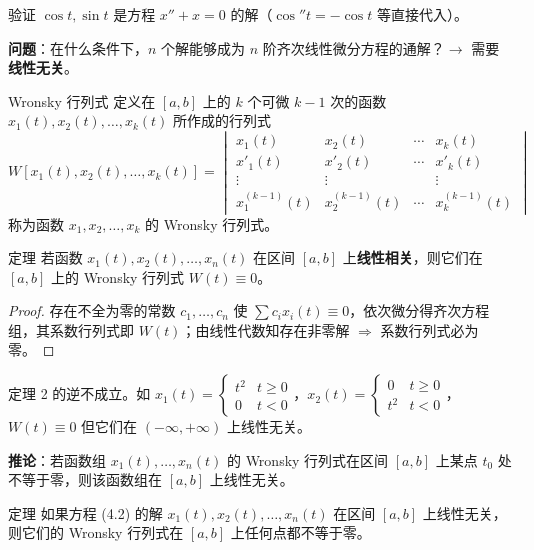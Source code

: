 \begin{example}
验证 $\cos t, \sin t$ 是方程 $x'' + x = 0$ 的解（$\cos'' t = -\cos t$ 等直接代入）。
\end{example}

\textbf{问题}：在什么条件下，$n$ 个解能够成为 $n$ 阶齐次线性微分方程的通解？$\rightarrow$ 需要\textbf{线性无关}。

\begin{mydefinition}{Wronsky 行列式}
定义在 $[a,b]$ 上的 $k$ 个可微 $k-1$ 次的函数 $x_1(t), x_2(t), \ldots, x_k(t)$ 所作成的行列式
$$W[x_1(t), x_2(t), \ldots, x_k(t)] = \begin{vmatrix} x_1(t) & x_2(t) & \cdots & x_k(t) \\ x'_1(t) & x'_2(t) & \cdots & x'_k(t) \\ \vdots & \vdots & & \vdots \\ x_1^{(k-1)}(t) & x_2^{(k-1)}(t) & \cdots & x_k^{(k-1)}(t) \end{vmatrix}$$
称为函数 $x_1, x_2, \ldots, x_k$ 的 Wronsky 行列式。
\end{mydefinition}

\begin{myTheorem}{定理}
若函数 $x_1(t), x_2(t), \ldots, x_n(t)$ 在区间 $[a,b]$ 上\textbf{线性相关}，则它们在 $[a,b]$ 上的 Wronsky 行列式 $W(t) \equiv 0$。
\end{myTheorem}

\begin{proof}
存在不全为零的常数 $c_1, \ldots, c_n$ 使 $\sum c_i x_i(t) \equiv 0$，依次微分得齐次方程组，其系数行列式即 $W(t)$；由线性代数知存在非零解 $\Rightarrow$ 系数行列式必为零。
\end{proof}

\begin{remark}
定理 2 的逆不成立。如 $x_1(t) = \begin{cases} t^2 & t \ge 0 \\ 0 & t < 0 \end{cases}$，$x_2(t) = \begin{cases} 0 & t \ge 0 \\ t^2 & t < 0 \end{cases}$，$W(t) \equiv 0$ 但它们在 $(-\infty, +\infty)$ 上线性无关。
\end{remark}

\textbf{推论}：若函数组 $x_1(t), \ldots, x_n(t)$ 的 Wronsky 行列式在区间 $[a,b]$ 上某点 $t_0$ 处不等于零，则该函数组在 $[a,b]$ 上线性无关。

\begin{myTheorem}{定理}
如果方程 (4.2) 的解 $x_1(t), x_2(t), \ldots, x_n(t)$ 在区间 $[a,b]$ 上线性无关，则它们的 Wronsky 行列式在 $[a,b]$ 上任何点都不等于零。
\end{myTheorem}

